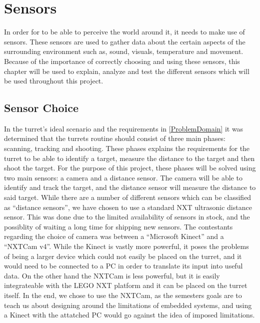 \chapter{Sensors} \label{sensors}
In order for \name to be able to perceive the world around it, it needs to make
use of sensors. These sensors are used to gather data about the certain aspects
of the surrounding environment such as, sound, visuals, temperature and
movement. Because of the importance of correctly choosing and using these
sensors, this chapter will be used to explain, analyze and test the different
sensors which will be used throughout this project.

\section{Sensor Choice}
In the turret's ideal scenario and the requirements in
\autoref{ProblemDomain} it was determined that the turrets routine should
consist of three main phases: scanning, tracking and shooting. These phases explains the
requirements for the turret to be able to identify a target, measure the
distance to the target and then shoot the target. For the purpose of this
project, these phases will be solved using two main sensors: a camera and a
distance sensor. The camera will be able to identify and track the target, and
the distance sensor will measure the distance to said target. While there are a
number of different sensors which can be classified as ``distance sensors'', we
have chosen to use a standard NXT ultrasonic distance sensor. This was done due
to the limited availability of sensors in stock, and the possiblity of waiting a
long time for shipping new sensors. The contestants regarding the choice of
camera was between a ``Microsoft Kinect'' and a ``NXTCam v4''. While the Kinect
is vastly more powerful, it poses the problems of being a larger device which
could not easily be placed on the turret, and it would need to be connected to a
PC in order to translate its input into useful data. On the other hand the
NXTCam is less powerful, but it is easily integrateable with the LEGO NXT
platform and it can be placed on the turret itself. In the end, we chose to use
the NXTCam, as the semesters goals are to teach us about designing around the
limitations of embedded systems, and using a Kinect with the attatched PC would
go against the idea of imposed limitations.




% 
% 
% 
% 
